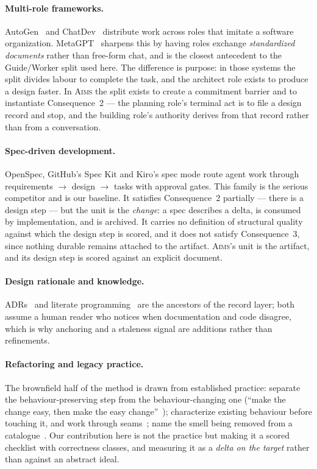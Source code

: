 \documentclass[11pt]{article}
\newcommand{\aims}{\textsc{Aims}}
\begin{document}
\paragraph{Multi-role frameworks.} AutoGen~\cite{wu2023autogen} and ChatDev~\cite{qian2024chatdev} distribute work across roles that imitate a software organization. MetaGPT~\cite{hong2024metagpt} sharpens this by having roles exchange \emph{standardized documents} rather than free-form chat, and is the closest antecedent to the Guide/Worker split used here. The difference is purpose: in those systems the split divides labour to complete the task, and the architect role exists to produce a design faster. In \aims{} the split exists to create a commitment barrier and to instantiate Consequence~2 --- the planning role's terminal act is to file a design record and stop, and the building role's authority derives from that record rather than from a conversation.

\paragraph{Spec-driven development.} OpenSpec, GitHub's Spec Kit and Kiro's spec mode route agent work through requirements $\rightarrow$ design $\rightarrow$ tasks with approval gates. This family is the serious competitor and is our baseline. It satisfies Consequence~2 partially --- there is a design step --- but the unit is the \emph{change}: a spec describes a delta, is consumed by implementation, and is archived. It carries no definition of structural quality against which the design step is scored, and it does not satisfy Consequence~3, since nothing durable remains attached to the artifact. \aims{}'s unit is the artifact, and its design step is scored against an explicit document.

\paragraph{Design rationale and knowledge.} ADRs~\cite{nygard2011adr} and literate programming~\cite{knuth1984literate} are the ancestors of the record layer; both assume a human reader who notices when documentation and code disagree, which is why anchoring and a staleness signal are additions rather than refinements.

\paragraph{Refactoring and legacy practice.} The brownfield half of the method is drawn from established practice: separate the behaviour-preserving step from the behaviour-changing one (``make the change easy, then make the easy change''~\cite{beck2012tweet}); characterize existing behaviour before touching it, and work through seams~\cite{feathers2004working}; name the smell being removed from a catalogue~\cite{fowler2018refactoring}. Our contribution here is not the practice but making it a scored checklist with correctness classes, and measuring it as a \emph{delta on the target} rather than against an abstract ideal.
\end{document}
